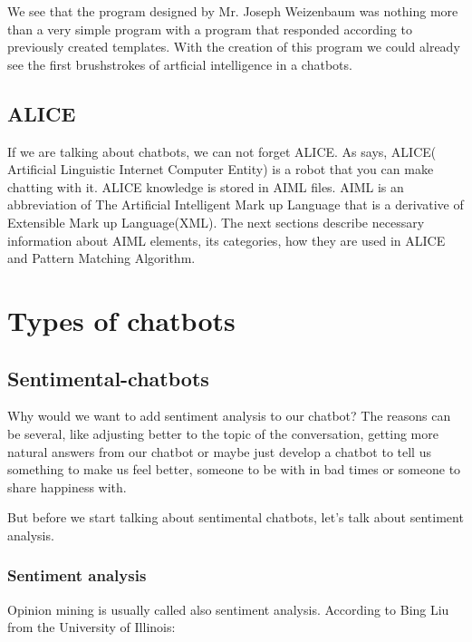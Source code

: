 \documentclass[12pt,twoside]{article}
\theoremstyle{plain}
\theoremstyle{definition}
\theoremstyle{remark}
\begin{document}
We see that the program designed by Mr. Joseph Weizenbaum was nothing more than a very simple program with a program that responded according to previously created templates. With the creation of this program we could already see the first brushstrokes of artficial intelligence in a chatbots.
 

\subsection{ALICE}
	\label{sec:alice}
	
	If we are talking about chatbots, we can not forget ALICE. As \cite{shawar2002comparison} says, ALICE( Artificial Linguistic Internet Computer Entity) is a robot that you can make chatting with it. ALICE knowledge is stored in AIML files. AIML is an abbreviation of The Artificial Intelligent Mark up Language that is a derivative of Extensible Mark up Language(XML). The next sections describe necessary information about AIML elements, its categories, how they are used in ALICE and Pattern Matching Algorithm.

\section{Types of chatbots}
\label{sec:types}

	\subsection{Sentimental-chatbots}
	\label{sec:sentimental}
	
	Why would we want to add sentiment analysis to our chatbot? The reasons can be several, like adjusting better to the topic of the conversation, getting more natural answers from our chatbot or maybe just develop a chatbot to tell us something to make us feel better, someone to be with in bad times or someone to share happiness with.
	
	But before we start talking about sentimental chatbots, let's talk about sentiment analysis.
	
		\subsubsection{Sentiment analysis}
		\label{sec::sentiment_analysis}
		
		Opinion mining is usually called also sentiment analysis. According to Bing Liu from the University of Illinois: \\
		
\end{document}
